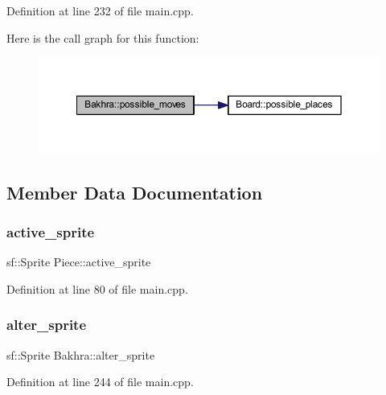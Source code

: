 Definition at line 232 of file main.\+cpp.

Here is the call graph for this function\+:
\nopagebreak
\begin{figure}[H]
\begin{center}
\leavevmode
\includegraphics[width=350pt]{class_bakhra_a1df8a0eaf723807f8293d97edf701d46_cgraph}
\end{center}
\end{figure}


\subsection{Member Data Documentation}
\mbox{\label{class_piece_a65fa621a87983d21756c2d2d63e8189b}} 
\subsubsection{\texorpdfstring{active\_sprite}{active\_sprite}}
{\footnotesize\ttfamily sf\+::\+Sprite Piece\+::active\+\_\+sprite\hspace{0.3cm}{\ttfamily [inherited]}}



Definition at line 80 of file main.\+cpp.

\mbox{\label{class_bakhra_a40815fd60319b4583844b8897cfdca32}} 
\subsubsection{\texorpdfstring{alter\_sprite}{alter\_sprite}}
{\footnotesize\ttfamily sf\+::\+Sprite Bakhra\+::alter\+\_\+sprite\hspace{0.3cm}{\ttfamily [static]}}



Definition at line 244 of file main.\+cpp.

